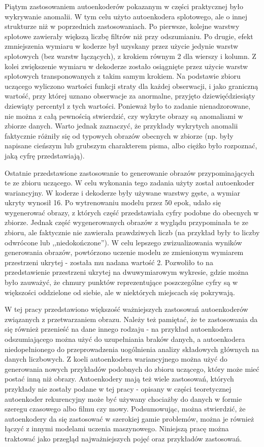 \documentclass[12pt]{mwbk}
\theoremstyle{plain}
\theoremstyle{definition}
\theoremstyle{remark}
\begin{document}
Piątym zastosowaniem autoenkoderów pokazanym w części praktycznej było wykrywanie anomalii. W tym celu użyto autoenkodera splotowego, ale o innej strukturze niż w poprzednich zastosowaniach. Po pierwsze, kolejne warstwy splotowe zawierały większą liczbę filtrów niż przy odszumianiu. Po drugie, efekt zmniejszenia wymiaru w koderze był uzyskany przez użycie jedynie warstw splotowych (bez warstw łączących), z krokiem równym 2 dla wierszy i kolumn. Z kolei zwiększenie wymiaru w dekoderze zostało osiągnięte przez użycie warstw splotowych transponowanych z takim samym krokiem. Na podstawie zbioru uczącego wyliczono wartości funkcji straty dla każdej obserwacji, i jako graniczną wartość, przy której uznano obserwacje za anormalne, przyjęto dziewięćdziesiąty dziewiąty percentyl z tych wartości.  Ponieważ było to zadanie nienadzorowane, nie można z całą pewnością stwierdzić, czy wykryte obrazy są anomaliami w zbiorze danych. Warto jednak zaznaczyć, że przykłady wykrytych anomalii faktycznie różniły się od typowych obrazów obecnych w zbiorze (np. były napisane cieńszym lub grubszym charakterem pisma, albo ciężko było rozpoznać, jaką cyfrę przedstawiają).

Ostatnie przedstawione zastosowanie to generowanie obrazów przypominających te ze zbioru uczącego. W celu wykonania tego zadania użyty został autoenkoder wariancyjny. W koderze i dekoderze były używane warstwy gęste, a wymiar ukryty wynosił 16. Po wytrenowaniu modelu przez 50 epok, udało się wygenerować obrazy, z których część przedstawiała cyfry podobne do obecnych w zbiorze. Jednak część wygenerowanych obrazów z wyglądu przypominała te ze zbioru, ale faktycznie nie zawierała prawdziwych liczb (na przykład były to liczby odwrócone lub ,,niedokończone''). W celu lepszego zwizualizowania wyników generowania obrazów, powtórzono uczenie modelu ze zmienionym wymiarem przestrzeni ukrytej - została mu nadana wartość 2. Pozwoliło to na przedstawienie przestrzeni ukrytej na dwuwymiarowym wykresie, gdzie można było zauważyć, że chmury punktów reprezentujące poszczególne cyfry są w większości oddzielone od siebie, ale w niektórych miejscach się pokrywają.

W tej pracy przedstawiono większość ważniejszych zastosowań autoenkoderów związanych z przetwarzaniem obrazu. Należy też pamiętać, że te zastosowania da się również przenieść na dane innego rodzaju - na przykład autoenkodera odszumiającego można użyć do uzupełniania braków danych, a autoenkodera niedopełnionego do przeprowadzenia uogólnienia analizy składowych głównych na danych liczbowych. Z koeli autoenkodera wariancyjnego można użyć do generowania nowych przykładów podobnych do zbioru uczącego, który może mieć postać inną niż obrazy. Autoenkodery mają też wiele zastosowań, których przykłady nie zostały podane w tej pracy - opisany w części teoretycznej autoenkoder rekurencyjny może być używany chociażby do danych w formie szeregu czasowego albo filmu czy mowy. Podsumowując, można stwierdzić, że autoenkodery da się zastosować w szerokiej gamie problemów, można je również łączyć z innymi modelami uczenia maszynowego. Niniejszą pracę można traktować jako przegląd najważniejszych pojęć oraz przykładów zastosowań.
\end{document}
